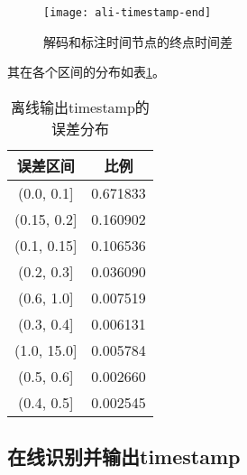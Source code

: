 \begin{figure}[!ht]
	\centering
	\texttt{[image: ali-timestamp-end]}
	\caption{解码和标注时间节点的终点时间差}
\label{fig:ali-timestamp}
\end{figure}

其在各个区间的分布如表\ref{tab:offline-dis}。

\begin{table}[h]
 \centering
 \caption{离线输出timestamp的误差分布}
	 \begin{tabular*}{1\textwidth}{@{\extracolsep{\fill}}cc}
	 \toprule
		{\bf 误差区间} & {\bf 比例} \\
	 \midrule
		(0.0, 0.1]   &  0.671833 \\
		(0.15, 0.2]  &  0.160902 \\
		(0.1, 0.15]  &  0.106536 \\
		(0.2, 0.3]   &  0.036090 \\
		(0.6, 1.0]   &  0.007519 \\
		(0.3, 0.4]   &  0.006131 \\
		(1.0, 15.0]  &  0.005784 \\
		(0.5, 0.6]   &  0.002660 \\
		(0.4, 0.5]   &  0.002545 \\
	 \bottomrule
	 \end{tabular*}%
 \label{tab:offline-dis}%
\end{table}%




\subsection{在线识别并输出timestamp}